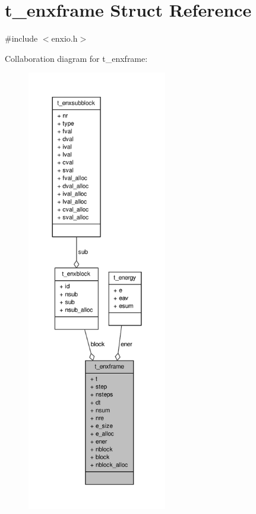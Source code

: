 \hypertarget{structt__enxframe}{\section{t\-\_\-enxframe \-Struct \-Reference}
\label{structt__enxframe}
}


{\ttfamily \#include $<$enxio.\-h$>$}



\-Collaboration diagram for t\-\_\-enxframe\-:
\nopagebreak
\begin{figure}[H]
\begin{center}
\leavevmode
\includegraphics[height=550pt]{structt__enxframe__coll__graph}
\end{center}
\end{figure}
